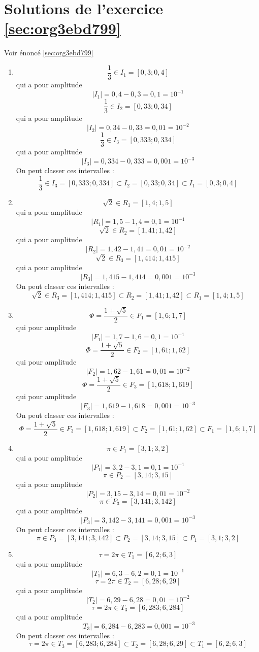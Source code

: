 \documentclass[a4paper, 11pt, twoside]{book}
\begin{document}
\section{Solutions de l'exercice \ref{sec:org3ebd799}}
\label{sec:org0af5bba}
Voir énoncé \ref{sec:org3ebd799}

\begin{enumerate}
\item \[\dfrac{1}{3}\in I_1 = [0,3 ; 0,4]\] qui a pour amplitude \[|I_1|
      = 0,4 - 0,3 = 0,1 = 10^{-1}\]
\[\dfrac{1}{3}\in I_2 = [0,33 ; 0,34]\] qui a pour amplitude
\[|I_2| = 0,34 - 0,33 = 0,01 = 10^{-2}\]
\[\dfrac{1}{3}\in I_3 = [0,333 ; 0,334]\] qui a pour amplitude
\[|I_3| = 0,334 - 0,333 = 0,001 = 10^{-3}\]
On peut classer ces intervalles :\[\dfrac{1}{3}\in I_3 = [0,333 ;
      0,334] \subset I_2 = [0,33 ; 0,34] \subset I_1 = [0,3 ; 0,4]\]
\item \[\sqrt{2}\in R_1 = [1,4 ; 1,5]\] qui a pour amplitude \[|R_1| =
      1,5 - 1,4 = 0,1 = 10^{-1}\]
\[\sqrt{2}\in R_2 = [1,41 ; 1,42]\] qui a pour amplitude \[|R_2| =
      1,42 - 1,41 = 0,01 = 10^{-2}\]
\[\sqrt{2}\in R_3 = [1,414 ; 1,415]\] qui a pour amplitude \[|R_3|
      = 1,415 - 1,414 = 0,001 = 10^{-3}\]
On peut classer ces intervalles :\[\sqrt{2}\in R_3 = [1,414 ;
      1,415] \subset R_2 = [1,41 ; 1,42]\subset R_1 = [1,4 ; 1,5]\]
\item \[\Phi = \dfrac{1 + \sqrt{5}}{2}\in F_1 = [1,6 ; 1,7]\] qui pour
amplitude \[|F_1| = 1,7 - 1,6 = 0,1 = 10^{-1}\]
\[\Phi = \dfrac{1 + \sqrt{5}}{2}\in F_2 = [1,61 ; 1,62]\] qui pour
amplitude \[|F_2| = 1,62 - 1,61 = 0,01 = 10^{-2}\]
\[\Phi = \dfrac{1 + \sqrt{5}}{2}\in F_3 = [1,618 ; 1,619]\] qui pour
amplitude \[|F_3| = 1,619 - 1,618 = 0,001 = 10^{-3}\]
On peut classer ces intervalles :\[\Phi = \dfrac{1 +
      \sqrt{5}}{2}\in F_3 = [1,618 ; 1,619] \subset F_2 = [1,61 ;
      1,62]\subset F_1 = [1,6 ; 1,7]\]
\item \[\pi\in P_1 = [3,1 ; 3,2]\] qui a pour amplitude \[|P_1| = 3,2 -
      3,1 = 0,1 = 10^{-1}\]
\[\pi\in P_2 = [3,14 ; 3,15]\] qui a pour amplitude \[|P_2| = 3,15 -
      3,14 = 0,01 = 10^{-2}\]
\[\pi\in P_3 = [3,141 ; 3,142]\] qui a pour amplitude \[|P_3| = 3,142 -
      3,141 = 0,001 = 10^{-3}\]
On peut classer ces intervalles : \[\pi\in P_3 = [3,141 ;
      3,142]\subset P_2 = [3,14 ; 3,15]\subset P_1 = [3,1 ; 3,2]\]
\item \[\tau = 2\pi\in T_1 = [6,2 ; 6,3]\] qui a pour amplitude \[|T_1| = 6,3 -
      6,2 = 0,1 = 10^{-1}\]
\[\tau = 2\pi\in T_2 = [6,28 ; 6,29]\] qui a pour amplitude \[|T_2| = 6,29 -
      6,28 = 0,01 = 10^{-2}\]
\[\tau = 2\pi\in T_3 = [6,283 ; 6,284]\] qui a pour amplitude \[|T_3| = 6,284 -
      6,283 = 0,001 = 10^{-3}\]
On peut classer ces intervalles : \[\tau = 2\pi\in T_3 = [6,283 ;
      6,284]\subset T_2 = [6,28 ; 6,29]\subset T_1 = [6,2 ; 6,3]\]
\end{enumerate}
\end{document}
